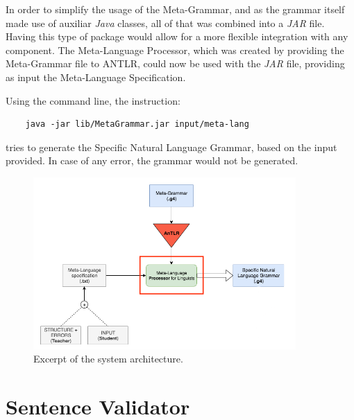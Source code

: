 In order to simplify the usage of the Meta-Grammar, and as the grammar itself made use of auxiliar \emph{Java} classes, all of that was combined into a \emph{JAR} file.
Having this type of package would allow for a more flexible integration with any component.
The Meta-Language Processor, which was created by providing the Meta-Grammar file to ANTLR, could now be used with the \emph{JAR} file, 
providing as input the Meta-Language Specification. 

Using the command line, the instruction:
\begin{Verbatim}
	java -jar lib/MetaGrammar.jar input/meta-lang
\end{Verbatim}
\noindent tries to generate the Specific Natural Language Grammar, based on the input provided. In case of any error, the grammar would not be generated.

\begin{figure}[h]
    \centering
    \includegraphics[width=10cm]{images/system_meta_processor.png}
    \caption{Excerpt of the system architecture.}
    \label{fig:system_architecture}
\end{figure}


\section{Sentence Validator}

